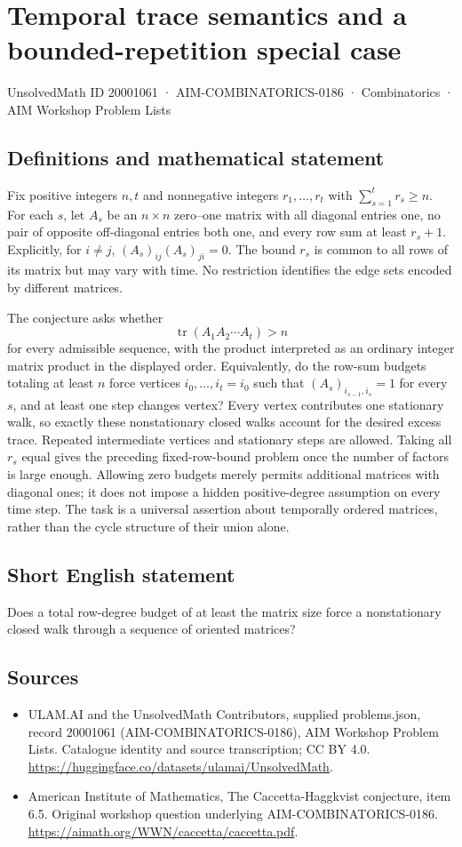 \documentclass[11pt,a4paper]{article}
\begin{document}
\section*{Temporal trace semantics and a bounded-repetition special case}\label{20001061}
{\small UnsolvedMath ID 20001061 · AIM-COMBINATORICS-0186 · Combinatorics · AIM Workshop Problem Lists}
\subsection{Definitions and mathematical statement}
Fix positive integers $n,t$ and nonnegative integers $r_1,\ldots,r_t$ with
$\sum_{s=1}^t r_s\geq n$.
For each $s$, let $A_s$ be an $n\times n$ zero--one matrix with all diagonal entries one, no pair of opposite off-diagonal entries both one, and every row sum at least $r_s+1$.
Explicitly, for $i\ne j$,
$(A_s)_{ij}(A_s)_{ji}=0$.
The bound $r_s$ is common to all rows of its matrix but may vary with time.
No restriction identifies the edge sets encoded by different matrices.

The conjecture asks whether
\[
 \operatorname{tr}(A_1A_2\cdots A_t)>n
\]
for every admissible sequence, with the product interpreted as an ordinary integer matrix product in the displayed order.
Equivalently, do the row-sum budgets totaling at least $n$ force vertices $i_0,\ldots,i_t=i_0$ such that
$(A_s)_{i_{s-1},i_s}=1$ for every $s$, and at least one step changes vertex?
Every vertex contributes one stationary walk, so exactly these nonstationary closed walks account for the desired excess trace.
Repeated intermediate vertices and stationary steps are allowed.
Taking all $r_s$ equal gives the preceding fixed-row-bound problem once the number of factors is large enough.
Allowing zero budgets merely permits additional matrices with diagonal ones; it does not impose a hidden positive-degree assumption on every time step.
The task is a universal assertion about temporally ordered matrices, rather than the cycle structure of their union alone.
\subsection{Short English statement}
Does a total row-degree budget of at least the matrix size force a nonstationary closed walk through a sequence of oriented matrices?
\subsection{Sources}
\begin{itemize}
\item[S1] ULAM.AI and the UnsolvedMath Contributors, supplied problems.json, record 20001061 (AIM-COMBINATORICS-0186), AIM Workshop Problem Lists. Catalogue identity and source transcription; CC BY 4.0.
\url{https://huggingface.co/datasets/ulamai/UnsolvedMath}.
\item[S2] American Institute of Mathematics, The Caccetta-Haggkvist conjecture, item 6.5. Original workshop question underlying AIM-COMBINATORICS-0186.
\url{https://aimath.org/WWN/caccetta/caccetta.pdf}.
\end{itemize}
\end{document}
